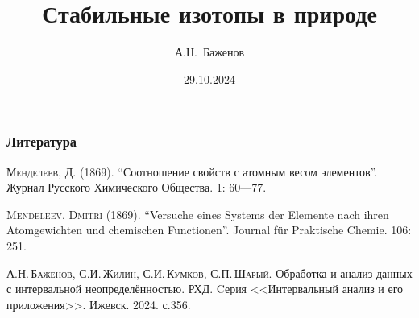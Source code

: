 \documentclass{beamer}
\title{Стабильные изотопы в природе} %
\author{А.Н.~Баженов}
\institute{%
ФТИ им.А.Ф.Иоффе РАН\\
СПбПУ Петра Великого, Физмех\\
\bigskip	
ДОПОЛНИТЕЛЬНАЯ ПРОФЕССИОНАЛЬНАЯ ПРОГРАММА ПОВЫШЕНИЯ КВАЛИФИКАЦИИ\\
<<Новейшие достижения физики и математического моделирования>> 
}
\date{29.10.2024} %
\begin{document}
\begin{frame}
\titlepage %
\end{frame}



	




















%


\begin{frame}
\frametitle{Литература}
\begin{thebibliography}{9}

{\footnotesize
{}
\textsc{Менделеев, Д.} (1869). “Соотношение свойств с атомным весом элементов”. Журнал Русского Химического Общества. 1: 60—77.

\textsc{Mendeleev, Dmitri} (1869). “Versuche eines Systems der Elemente nach ihren Atomgewichten und chemischen Functionen”. Journal für Praktische Chemie. 106: 251.

 \textsc{А.Н.\,Баженов, С.И.\,Жилин, С.И.\,Кумков, С.П.\,Шарый.} Обработка и анализ данных с интервальной неопределённостью. РХД. Cерия <<Интервальный анализ и его приложения>>. Ижевск. 2024. с.356.	
}



\end{thebibliography}	
\end{frame}
\end{document}
